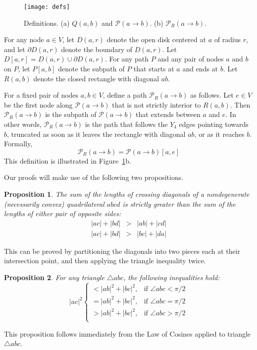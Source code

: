 \pdfoutput=1  \documentclass[11pt]{article}
\newtheorem{proposition}{Proposition}
\newcommand{\Pa}{{\mathcal P}}
\begin{document}
\begin{figure}[htbp]
\centering
\texttt{[image: defs]}
\caption{Definitions. (a) $Q(a,b)$ and $\Pa(a \rightarrow b)$. (b) $\Pa_R(a \rightarrow b)$.}
\label{fig:defs}
\end{figure}


For any node $a \in V$, let $D(a,r)$ denote the open disk centered at
$a$ of radius $r$, and let $\partial D(a,r)$ denote the boundary of
$D(a, r)$. Let $D[a,r] = D(a,r) \cup \partial D(a,r)$.
For any path $P$ and any pair of nodes $a$ and $b$ on $P$, let $P[a,b]$
denote the subpath of $P$ that starts at $a$ and ends at $b$.
Let $R(a,b)$ denote the closed rectangle with diagonal $ab$.

For a fixed pair of nodes $a,b \in V$, define a path
$\Pa_R(a \rightarrow b)$ as follows. Let $e \in V$ be the first node
along $\Pa(a \rightarrow b)$ that is not strictly interior to
$R(a,b)$. Then $\Pa_R(a \rightarrow b)$ is the subpath of $\Pa(a \rightarrow b)$
that extends between $a$ and $e$. In other words, $\Pa_R(a \rightarrow b)$ is
the path that follows the $Y_4$ edges pointing towards $b$,  truncated as soon
as it leaves the rectangle with diagonal $ab$, or as it reaches $b$. Formally,
\[
\Pa_R(a \rightarrow b) = \Pa(a \rightarrow b)[a, e]
\]
This definition is illustrated in Figure~\ref{fig:defs}b.

Our proofs will make use of the following two propositions.

\begin{proposition}
The sum of the lengths of crossing diagonals of a nondegenerate
(necessarily convex) quadrilateral $abcd$ is strictly greater than the sum of
the lengths of either pair of opposite sides:
\begin{eqnarray*}
|ac| + |bd| &>& |ab| + |cd| \\
|ac| + |bd| &>& |bc| + |da|
\end{eqnarray*}
\label{fact:quad}
\end{proposition}
This can be proved by partitioning
the diagonals into two pieces each at their intersection
point, and then applying the triangle inequality twice.

\begin{proposition}
For any triangle $\triangle abc$, the following inequalities hold:
\[|ac|^2
\begin{cases}
< |ab|^2 + |bc|^2, & \text{if } \angle{abc} < \pi/2 \\
= |ab|^2 + |bc|^2, & \text{if } \angle{abc} = \pi/2 \\
> |ab|^2 + |bc|^2, & \text{if } \angle{abc} > \pi/2 \\
\end{cases}
\]
\label{fact:tri}
\end{proposition}
This proposition follows immediately from the Law of Cosines applied
to triangle $\triangle abc$.
\end{document}
